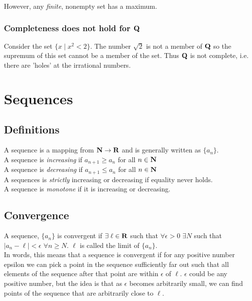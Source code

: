 \documentclass[12pt]{article}
\begin{document}
      However, any \emph{finite}, nonempty set has a maximum.
    \subsubsection{Completeness does not hold for $\mathbf{Q}$}
      Consider the set $\{x \mid x^2 < 2\}$. The number $\sqrt{2}$ is not a member of $\mathbf{Q}$ so the supremum of this
      set cannot be a member of the set. Thus $\mathbf{Q}$ is not complete, i.e. there are 'holes' at the irrational numbers.
\section{Sequences}
  \subsection{Definitions}
    A sequence is a mapping from $\mathbf{N} \to \mathbf{R}$ and is generally written as $\{a_n\}$.\\

    A sequence is \emph{increasing} if $a_{n+1} \geq a_n$ for all $n \in \mathbf{N}$\\
    A sequence is \emph{decreasing} if $a_{n+1} \leq a_n$ for all $n \in \mathbf{N}$\\
    A sequences is \emph{strictly} increasing or decreasing if equality never holds.\\
    A sequence is \emph{monotone} if it is increasing or decreasing.\\

  \subsection{Convergence}
    A sequence, $\{a_n\}$ is convergent if $\exists\;\ell \in \mathbf{R}$ such that $\forall \epsilon > 0$ 
    $\exists N$ such that $|a_n - \ell| < \epsilon$ $\forall n \geq N$. $\ell$ is called the limit of $\{a_n\}$.\\
    
    In words, this means that a sequence is convergent if for any positive number epsilon we can pick a 
    point in the sequence sufficiently far out such that all elements of the sequence after that point 
    are within $\epsilon$ of $\ell$. $\epsilon$ could be any positive number, but the idea is that as 
    $\epsilon$ becomes arbitrarily small, we can find points of the sequence that are arbitrarily close 
    to $\ell$.\\
\end{document}
